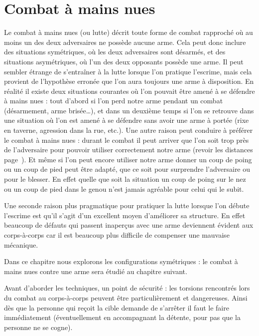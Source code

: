 \chapter{Combat à mains nues}


Le combat à mains nues (ou lutte) décrit toute forme de combat rapproché où au moins un des deux adversaires ne possède aucune arme.
Cela peut donc inclure des situations symétriques, où les deux adversaires sont désarmés, et des situations asymétriques, où l'un des deux opposants possède une arme.
Il peut sembler étrange de s'entraîner à la lutte lorsque l'on pratique l'escrime, mais cela provient de l'hypothèse erronée que l'on aura toujours une arme à disposition.
En réalité il existe deux situations courantes où l'on pouvait être amené à se défendre à mains nues : tout d'abord si l'on perd notre arme pendant un combat (désarmement, arme brisée…), et dans un deuxième temps si l'on se retrouve dans une situation où l'on est amené à se défendre sans avoir une arme à portée (rixe en taverne, agression dans la rue, etc.).
Une autre raison peut conduire à préférer le combat à mains nues : durant le combat il peut arriver que l'on soit trop près de l'adversaire pour pouvoir utiliser correctement notre arme (revoir les distances page~\pageref{conc:def:distances}).
Et même si l'on peut encore utiliser notre arme donner un coup de poing ou un coup de pied peut être adapté, que ce soit pour surprendre l'adversaire ou pour le blesser.
En effet quelle que soit la situation un coup de poing sur le nez ou un coup de pied dans le genou n'est jamais agréable pour celui qui le subit.

Une seconde raison plus pragmatique pour pratiquer la lutte lorsque l'on débute l'escrime est qu'il s'agit d'un excellent moyen d'améliorer sa structure.
En effet beaucoup de défauts qui passent inaperçus avec une arme deviennent évident aux corps-à-corps car il est beaucoup plus difficile de compenser une mauvaise mécanique.

Dans ce chapitre nous explorons les configurations symétriques : le combat à mains nues contre une arme sera étudié au chapitre suivant.

Avant d'aborder les techniques, un point de sécurité : les torsions rencontrés lors du combat au corps-à-corps peuvent être particulièrement et dangereuses.
Ainsi dès que la personne qui reçoit la cible demande de s'arrêter il faut le faire immédiatement (éventuellement en accompagnant la détente, pour pas que la personne ne se cogne).

